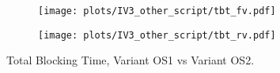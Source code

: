 \begin{figure}
	\centering
	\begin{subfigure}{.5\textwidth}
		\centering
		\texttt{[image: plots/IV3\_other\_script/tbt\_fv.pdf]}
		\label{fig:sub1}
	\end{subfigure}%
	\begin{subfigure}{.5\textwidth}
		\centering
		\texttt{[image: plots/IV3\_other\_script/tbt\_rv.pdf]}
		\label{fig:sub2}
	\end{subfigure}
	\caption{Total Blocking Time, Variant OS1 vs Variant OS2.}
	\label{figure:plt_original_test}
\end{figure}

\clearpage


